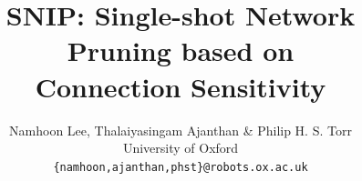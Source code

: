 \documentclass[dvipsnames]{article} %
\title{SNIP: Single-shot Network Pruning based on \\Connection Sensitivity}
\author{Namhoon Lee, Thalaiyasingam Ajanthan \& Philip H. S. Torr\\
University of Oxford\\
\texttt{\{namhoon,ajanthan,phst\}@robots.ox.ac.uk} \\
}
\begin{document}
\maketitle

\begin{abstract}
    
\end{abstract}













\appendix

\end{document}
